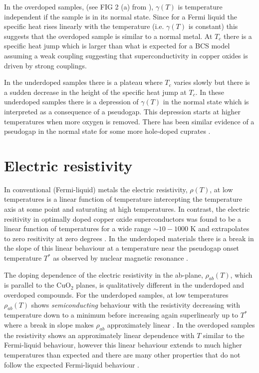 In the overdoped samples, (see FIG 2 (a) from \cite{Loram1997}), $\gamma (T)$ is temperature independent if the sample is in its normal state.
Since for a Fermi liquid the specific heat rises linearly with the temperature (i.e. $\gamma (T)$ is constant) this suggests that the overdoped sample is similar to a normal metal. 
At $T_c$ there is a specific heat jump which is larger than what is expected for a BCS model assuming a weak coupling suggesting that superconductivity in copper oxides is driven by strong couplings.

In the underdoped samples there is a plateau where $T_c$ varies slowly but there is a sudden decrease in the height of the specific heat jump at $T_c$.
In these underdoped samples there is a depression of $\gamma (T)$ in the normal state which is interpreted as a consequence of a pseudogap. 
This depression starts at higher temperatures when more oxygen is removed.
There has been similar evidence of a pseudogap in the normal state for some more hole-doped cuprates \cite{Loram2001}.


\section{Electric resistivity}
\label{sec:resistivity}

In conventional (Fermi-liquid) metals the electric resistivity, $\rho(T)$, at low temperatures is a linear function of temperature intercepting the temperature axis at some point and saturating at high temperatures.
In contrast, the electric resitivity in optimally doped copper oxide superconductors was found to be a linear function of temperatures for a wide range $\sim 10-1000$ K and extrapolates to zero resitivity at zero degrees \cite{Timusk1999,Muller2007}.
In the underdoped materials there is a break in the slope of this linear behaviour at a temperature near the pseudogap onset temperature $T^*$ as observed by nuclear magnetic resonance \cite{Bucher1993}.

The doping dependence of the electric resistivity in the ab-plane, $\rho_{ab}(T)$, which is parallel to the CuO$_2$ planes, is qualitatively different in the underdoped and overdoped compounds.
For the underdoped samples, at low temperatures $\rho_{ab}(T)$ shows \textit{semiconducting} behaviour with the resistivity decreasing with temperature down to a minimum before increasing again superlinearly up to $T^*$ where a break in slope makes $\rho_{ab}$ approximately linear \cite{Timusk1999}.
In the overdoped samples the resistivity shows an approximately linear dependence with $T$ \cite{Damascelli2003} similar to the Fermi-liquid behaviour, however this linear behaviour extends to much higher temperatures than expected and there are many other properties that do not follow the expected Fermi-liquid behaviour \cite{Orenstein2000}.


